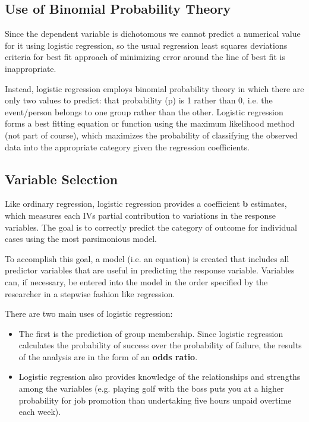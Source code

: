 ﻿\documentclass[a4paper,12pt]{article}
\begin{document}
\subsection{Use of Binomial Probability Theory}
Since the dependent variable is dichotomous we cannot predict a numerical value for it
using logistic regression, so the usual regression least squares deviations criteria for best fit
approach of minimizing error around the line of best fit is inappropriate.

Instead, logistic regression employs binomial probability theory in which there are only two values to
predict: that probability (p) is 1 rather than 0, i.e. the event/person belongs to one group
rather than the other. Logistic regression forms a best fitting equation or function using the
maximum likelihood method (not part of course), which maximizes the probability of classifying the observed
data into the appropriate category given the regression coefficients.

\subsection{Variable Selection}
Like ordinary regression, logistic regression provides a coefficient \textbf{b} estimates, which measures
each IVs partial contribution to variations in the response variables. The goal is to correctly predict
the category of outcome for individual cases using the most parsimonious model.

To accomplish this goal, a model (i.e. an equation) is created that includes all predictor variables that are useful in predicting the response variable. Variables can, if necessary, be entered into the model in the order specified by the researcher in a stepwise fashion like regression.

There are two main uses of logistic regression:
\begin{itemize}
\item The first is the prediction of group membership. Since logistic regression calculates the
probability of success over the probability of failure, the results of the analysis are in
the form of an \textbf{odds ratio}.
\item Logistic regression also provides knowledge of the relationships and strengths among
the variables (e.g. playing golf with the boss puts you at a higher probability for job
promotion than undertaking five hours unpaid overtime each week).
\end{itemize}
\end{document}
